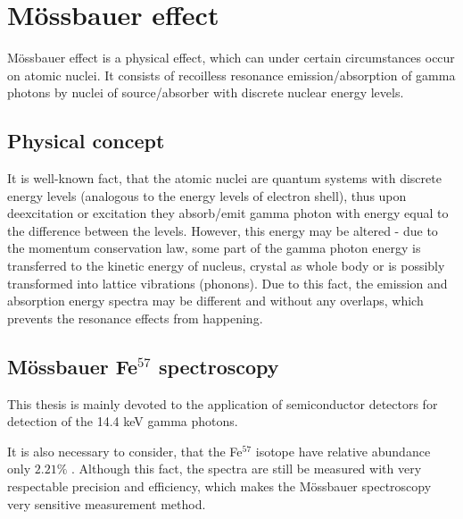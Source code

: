 
\chapter{Mössbauer effect}
Mössbauer effect is a physical effect, which can under certain circumstances occur on atomic nuclei. It consists of recoilless resonance emission/absorption of gamma photons by nuclei of source/absorber with discrete nuclear energy levels.  

\section{Physical concept}
It is well-known fact, that the atomic nuclei are quantum systems with discrete energy levels (analogous to the energy levels of electron shell), thus upon deexcitation or excitation they absorb/emit gamma photon with energy equal to the difference between the levels. However, this energy may be altered - due to the  momentum conservation law, some part of the gamma photon energy is transferred to the  kinetic energy of nucleus, crystal as whole body or is possibly transformed into lattice vibrations (phonons). Due to this fact, the emission and absorption energy spectra may be different and without any overlaps, which prevents the resonance effects from happening.


\section{Mössbauer Fe$^{57}$ spectroscopy}


This thesis is mainly devoted to the application of semiconductor detectors for detection of the 14.4 keV gamma photons.

It is also necessary to consider, that the Fe$^{57}$ isotope have relative abundance only $2.21 \%$ \cite{compounds}. Although this fact, the spectra are still be measured with very respectable precision and efficiency, which makes the Mössbauer spectroscopy very sensitive measurement method.
